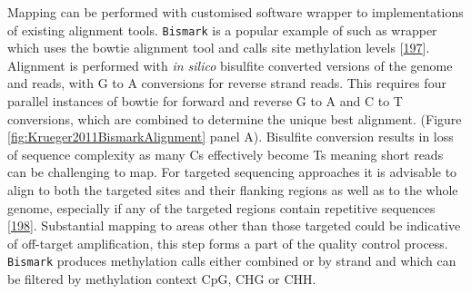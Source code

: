\documentclass[
]{book}
\begin{document}
Mapping can be performed with customised software wrapper to implementations of existing alignment tools.
\texttt{Bismark} is a popular example of such as wrapper which uses the bowtie alignment tool and calls site methylation levels {[}\protect\hyperlink{ref-Tran2014}{197}{]}.
Alignment is performed with \emph{in silico} bisulfite converted versions of the genome and reads, with G to A conversions for reverse strand reads.
This requires four parallel instances of bowtie for forward and reverse G to A and C to T conversions, which are combined to determine the unique best alignment.
(Figure \ref{fig:Krueger2011BismarkAlignment} panel A).
Bisulfite conversion results in loss of sequence complexity as many Cs effectively become Ts meaning short reads can be challenging to map.
For targeted sequencing approaches it is advisable to align to both the targeted sites and their flanking regions as well as to the whole genome, especially if any of the targeted regions contain repetitive sequences {[}\protect\hyperlink{ref-Bottcher2012}{198}{]}.
Substantial mapping to areas other than those targeted could be indicative of off-target amplification, this step forms a part of the quality control process.
\texttt{Bismark} produces methylation calls either combined or by strand and which can be filtered by methylation context CpG, CHG or CHH.
\end{document}
